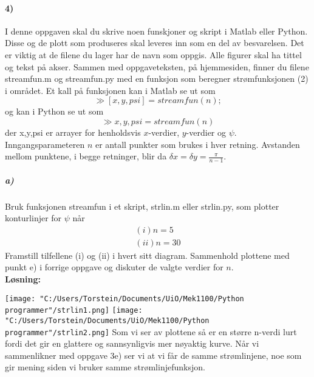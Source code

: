 \documentclass[11pt, A4paper,norsk]{article}
\begin{document}
		\paragraph{4)}
			\begin{flushleft}
I denne oppgaven skal du skrive noen funskjoner og skript i Matlab eller Python. Disse og de plott som produseres skal leveres inn som en del av besvarelsen. Det er viktig at de filene du lager har de navn som oppgis. Alle figurer skal ha tittel og tekst på akser.
Sammen med oppgaveteksten, på hjemmesiden, finner du filene streamfun.m og streamfun.py med en funksjon som beregner strømfunksjonen (2) i området. Et kall på funksjonen kan i Matlab se ut som $$\gg [x,y,psi]=streamfun(n);$$ og kan i Python se ut som $$\gg x,y,psi=streamfun(n)$$ der x,y,psi er arrayer for henholdsvis $x$-verdier, $y$-verdier og $\psi$. Inngangsparameteren $n$ er antall punkter som brukes i hver retning. Avstanden mellom punktene, i begge retninger, blir da $\delta x = \delta y = \frac{\pi}{n - 1}$.
			\end{flushleft}












			\subparagraph{a)}
				\begin{flushleft}
Bruk funksjonen streamfun i et skript, strlin.m eller strlin.py, som plotter konturlinjer for $\psi$ når
					\begin{align}
(i) n = 5 \nonumber \\
(ii) n = 30 \nonumber
					\end{align}
Framstill tilfellene (i) og (ii) i hvert sitt diagram. Sammenhold plottene med punkt e) i forrige oppgave og diskuter de valgte verdier for $n$. \\
\vspace{1mm}
\textbf{Løsning:} \\
\vspace{1mm}

\texttt{[image: "C:/Users/Torstein/Documents/UiO/Mek1100/Python programmer"/strlin1.png]}
\texttt{[image: "C:/Users/Torstein/Documents/UiO/Mek1100/Python programmer"/strlin2.png]}
Som vi ser av plottene så er en større n-verdi lurt fordi det gir en glattere og sannsynligvis mer nøyaktig kurve. Når vi sammenlikner med oppgave 3e) ser vi at vi får de samme strømlinjene, noe som gir mening siden vi bruker samme strømlinjefunksjon.
			\end{flushleft}
\end{document}
